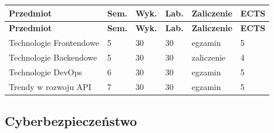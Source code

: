 \documentclass[12pt,a4paper]{article}
\newcommand{\thdrule}{\noalign{\global\setlength{\extrarowheight}{0pt}}}
\newcommand{\thdend}{\noalign{\global\setlength{\extrarowheight}{4pt}}}
\begin{document}
{\scriptsize
\begin{longtable}{m{6.5cm}m{0.7cm}m{1cm}m{1cm}m{1.7cm}m{0.7cm}}
\thdrule\toprule
\rowcolor{pjatkRed}
{\color{white}\footnotesize\textbf{\vphantom{Ag}Przedmiot}} & {\color{white}\footnotesize\textbf{\vphantom{Ag}Sem.}} & {\color{white}\footnotesize\textbf{\vphantom{Ag}Wyk.}} & {\color{white}\footnotesize\textbf{\vphantom{Ag}Lab.}} & {\color{white}\footnotesize\textbf{\vphantom{Ag}Zaliczenie}} & {\color{white}\footnotesize\textbf{\vphantom{Ag}ECTS}} \\
\midrule\thdend
\endfirsthead
\thdrule\toprule
\rowcolor{pjatkRed}
{\color{white}\footnotesize\textbf{\vphantom{Ag}Przedmiot}} & {\color{white}\footnotesize\textbf{\vphantom{Ag}Sem.}} & {\color{white}\footnotesize\textbf{\vphantom{Ag}Wyk.}} & {\color{white}\footnotesize\textbf{\vphantom{Ag}Lab.}} & {\color{white}\footnotesize\textbf{\vphantom{Ag}Zaliczenie}} & {\color{white}\footnotesize\textbf{\vphantom{Ag}ECTS}} \\
\midrule\thdend
\endhead
\rowcolor{tableRowLight} Technologie Frontendowe & 5 & 30 & 30 & {\scriptsize egzamin} & 5 \\
\rowcolor{tableRowAlt} Technologie Backendowe & 5 & 30 & 30 & {\scriptsize zaliczenie} & 4 \\
\rowcolor{tableRowLight} Technologie DevOps & 6 & 30 & 30 & {\scriptsize egzamin} & 5 \\
\rowcolor{tableRowAlt} Trendy w rozwoju API & 7 & 30 & 30 & {\scriptsize egzamin} & 5 \\
\bottomrule
\end{longtable}}

\subsection*{Cyberbezpieczeństwo}
\end{document}
